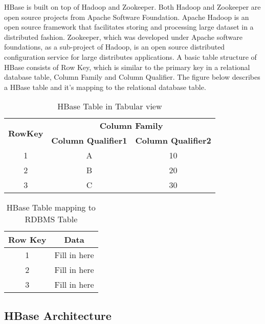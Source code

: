 \documentclass[11pt,a4paper,bibtotoc,idxtotoc,headsepline,footsepline,footexclude,BCOR12mm,DIV13]{scrbook}
\begin{document}
HBase is built on top of Hadoop and Zookeeper\cite{coprocessor:detail}. Both Hadoop and Zookeeper are open source projects from Apache Software Foundation. Apache Hadoop is an open source framework that facilitates storing and processing large dataset in a distributed fashion. Zookeeper, which was developed under Apache software foundations, as a sub-project of Hadoop, is an open source distributed configuration service for large distributes applications. A basic table structure of HBase consists of Row Key, which is similar to the primary key in a relational database table, Column Family and Column Qualifier. The figure below describes a HBase table and it's mapping to the relational database table.


\begin{table*}[htb!]
\centering
\begin{tabular}{|c|c|c|}
\hline
\multirow{2}{*}{\textbf{RowKey}} & \multicolumn{2}{c|}{\textbf{Column Family}}\\
\cline{2-3}
& \textbf{Column Qualifier1} & \textbf{Column Qualifier2}\\
\hline
1 & A & 10\\
2 & B & 20\\
3 & C & 30\\
\hline
\end{tabular}
\caption{HBase Table in Tabular view}
\label{table:HbaseTabularView}
\end{table*}

\begin{table*}[htb!]
\centering
\begin{tabular}{|c|c|}
\hline
\textbf{Row Key} & \textbf{Data}\\
\hline
1 & Fill in here\\
2 & Fill in here\\
3 & Fill in here\\
\hline
\end{tabular}
\caption{HBase Table mapping to RDBMS Table}
\label{table:HbaseTableRDBMSMapping}
\end{table*}


\newpage
\subsection{HBase Architecture}
\label{HBase Architecture}
\end{document}
